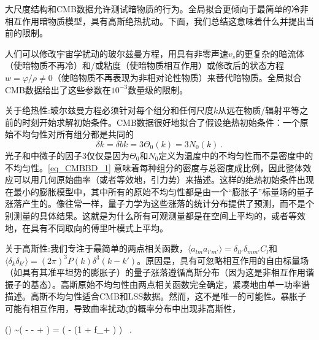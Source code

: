 
大尺度结构和CMB数据允许测试暗物质的行为。全局拟合更倾向于最简单的冷非相互作用暗物质模型，具有高斯绝热扰动。下面，我们总结这意味着什么并提出当前的限制。

人们可以修改宇宙学扰动的玻尔兹曼方程，用具有非零声速$v_s$的更复杂的暗流体（使暗物质不再冷）和/或粘度（使暗物质相互作用）或修改后的状态方程$w = \varphi/\rho \neq 0$（使暗物质不再表现为非相对论性物质）来替代暗物质。全局拟合CMB数据给出了这些参数在$10^{-3}$数量级的限制。

关于绝热性:玻尔兹曼方程必须针对每个组分和任何尺度$k$从远在物质/辐射平等之前的时刻开始求解初始条件。CMB数据很好地拟合了假设绝热初始条件：一个原始不均匀性对所有组分都是共同的
\begin{equation}\label{eq_CMBBD_1}
\delta k = \delta bk = 3\Theta_0(k) = 3N_0(k)~.
\end{equation}
光子和中微子的因子$3$仅仅是因为$\Theta_0$和$N_0$定义为温度中的不均匀性而不是密度中的不均匀性。\autoref{eq_CMBBD_1} 意味着每种组分的密度与总密度成比例，因此整体效应可以用几何原始曲率（或者等效地，引力势）来描述。这样的绝热初始条件出现在最小的膨胀模型中，其中所有的原始不均匀性都是由一个“膨胀子”标量场的量子涨落产生的。像往常一样，量子力学为这些涨落的统计分布提供了预测，而不是个别测量的具体结果。这就是为什么所有可观测量都是在空间上平均的，或者等效地，在具有不同取向的傅里叶模式上平均。

关于高斯性:我们专注于最简单的两点相关函数，$\langle a_{lm}a_{l'm'}\rangle = \delta_{ll'}\delta_{mm'} C_l$和
$\langle \delta_k \delta_{k'}\rangle = (2\pi)^3 P(k)  \delta^3(k - k')$。原因是，具有可忽略相互作用的自由标量场（如具有其准平坦势的膨胀子）的量子涨落遵循高斯分布（因为这是非相互作用谐振子的基态）。高斯原始不均匀性由两点相关函数完全确定，紧凑地由单一功率谱描述。高斯不均匀性适合CMB和LSS数据。然而，这不是唯一的可能性。暴胀子可能有相互作用，导致曲率扰动$\zeta$的概率分布中出现非高斯性，
\begin{equation}

\end{equation}

\phi(\zeta) \sim \exp \left( - -  + \cdots \right) = \exp \left( - (1 + f_{}\zeta + \cdots) \right) ~.

